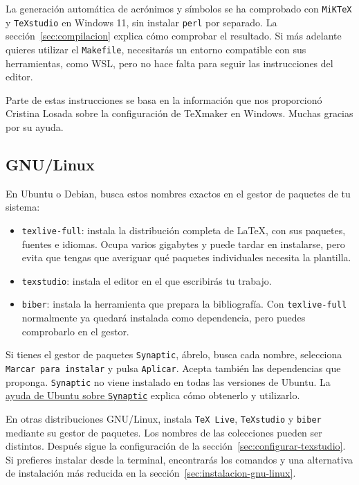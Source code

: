 La generación automática de acrónimos y símbolos se ha comprobado con \texttt{MiKTeX} y \texttt{TeXstudio} en Windows 11, sin instalar \texttt{perl} por separado. La sección~\ref{sec:compilacion} explica cómo comprobar el resultado. Si más adelante quieres utilizar el \texttt{Makefile}, necesitarás un entorno compatible con sus herramientas, como WSL, pero no hace falta para seguir las instrucciones del editor.

Parte de estas instrucciones se basa en la información que nos proporcionó Cristina Losada sobre la configuración de TeXmaker en Windows. Muchas gracias por su ayuda.

\subsection{GNU/Linux}

En Ubuntu o Debian, busca estos nombres exactos en el gestor de paquetes de tu sistema:

\begin{itemize}
  \item \texttt{texlive-full}: instala la distribución completa de \LaTeX{}, con sus paquetes, fuentes e idiomas. Ocupa varios gigabytes y puede tardar en instalarse, pero evita que tengas que averiguar qué paquetes individuales necesita la plantilla.
  \item \texttt{texstudio}: instala el editor en el que escribirás tu trabajo.
  \item \texttt{biber}: instala la herramienta que prepara la bibliografía. Con \texttt{texlive-full} normalmente ya quedará instalada como dependencia, pero puedes comprobarlo en el gestor.
\end{itemize}

Si tienes el gestor de paquetes \texttt{Synaptic}, ábrelo, busca cada nombre, selecciona \texttt{Marcar para instalar} y pulsa \texttt{Aplicar}. Acepta también las dependencias que proponga. \texttt{Synaptic} no viene instalado en todas las versiones de Ubuntu. La \href{https://help.ubuntu.com/stable/ubuntu-help/addremove-install-synaptic.html.en}{ayuda de Ubuntu sobre \texttt{Synaptic}} explica cómo obtenerlo y utilizarlo.

En otras distribuciones GNU/Linux, instala \texttt{TeX Live}, \texttt{TeXstudio} y \texttt{biber} mediante su gestor de paquetes. Los nombres de las colecciones pueden ser distintos. Después sigue la configuración de la sección~\ref{sec:configurar-texstudio}. Si prefieres instalar desde la terminal, encontrarás los comandos y una alternativa de instalación más reducida en la sección~\ref{sec:instalacion-gnu-linux}.

